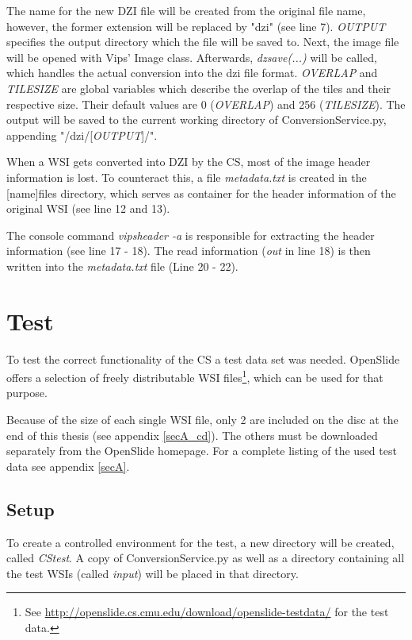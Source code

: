 The name for the new DZI file will be created from the original file name, however, the former extension will be replaced by "dzi" (see line 7). \emph{OUTPUT} specifies the output directory which the file will be saved to. Next, the image file will be opened with Vips' Image class. Afterwards, \emph{dzsave(...)} will be called, which handles the actual conversion into the dzi file format. \emph{OVERLAP} and \emph{TILESIZE} are global variables which describe the overlap of the tiles and their respective size. Their default values are 0 (\emph{OVERLAP}) and 256 (\emph{TILESIZE}). The output will be saved to the current working directory of ConversionService.py, appending "/dzi/[\emph{OUTPUT}]/".
\clearpage

When a WSI gets converted into DZI by the CS, most of the image header information is lost. To counteract this, a file \emph{metadata.txt} is created in the [name]{\textunderscore}files directory, which serves as container for the header information of the original WSI (see line 12 and 13).

The console command \emph{vipsheader -a} is responsible for extracting the header information (see line 17 - 18). The read information (\emph{out} in line 18) is then written into the \emph{metadata.txt} file (Line 20 - 22).


\section{Test}
\label{sec3_test}
To test the correct functionality of the CS a test data set was needed. OpenSlide offers a selection of freely distributable WSI files\footnote{
	See \url{http://openslide.cs.cmu.edu/download/openslide-testdata/} for the test data.
}, which can be used for that purpose.

Because of the size of each single WSI file, only 2 are included on the disc at the end of this thesis (see appendix \ref{secA_cd}). The others must be downloaded separately from the OpenSlide homepage. For a complete listing of the used test data see appendix \ref{secA}.

\subsection{Setup}

To create a controlled environment for the test, a new directory will be created, called \emph{CS{\textunderscore}test}. A copy of ConversionService.py as well as a directory containing all the test WSIs (called \emph{input}) will be placed in that directory.

